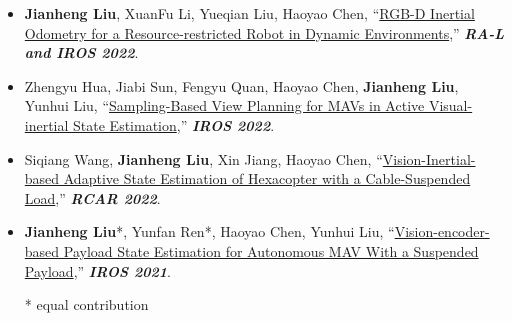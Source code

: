 \begin{itemize}
	\item \textbf{Jianheng Liu}, XuanFu Li, Yueqian Liu, Haoyao Chen, ``\href{https://github.com/HITSZ-NRSL/Dynamic-VINS}{RGB-D Inertial Odometry for a Resource-restricted Robot in Dynamic Environments},''
	\textbf{\emph{RA-L and IROS 2022}}.\\
	\vspace{-8pt}
	\item Zhengyu Hua, Jiabi Sun, Fengyu Quan, Haoyao Chen, \textbf{Jianheng Liu}, Yunhui Liu, ``\href{https://ieeexplore.ieee.org/abstract/document/9981941/}{Sampling-Based View Planning for MAVs in Active Visual-inertial State Estimation},''
	\textbf{\emph{IROS 2022}}.\\
	\vspace{-8pt}
	\item Siqiang Wang, \textbf{Jianheng Liu}, Xin Jiang, Haoyao Chen, ``\href{https://ieeexplore.ieee.org/abstract/document/9872194}{Vision-Inertial-based Adaptive State Estimation of Hexacopter with a Cable-Suspended Load},''
	\textbf{\emph{RCAR 2022}}.\\
	\vspace{-8pt}
	\item \textbf{Jianheng Liu}*, Yunfan Ren*, Haoyao Chen, Yunhui Liu, ``\href{https://github.com/jianhengLiu/Vision-encoder-based-Payload-State-Estimator}{Vision-encoder-based Payload State Estimation for Autonomous MAV With a Suspended Payload},''
	\textbf{\emph{IROS 2021}}.\\
	\vspace{-8pt}

\footnotesize{* equal contribution}
\end{itemize}